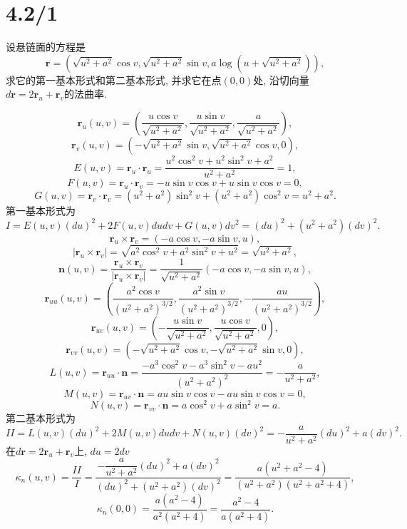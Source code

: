 \documentclass[11pt,a4paper]{article}
\author{刘逸灏 (515370910207)}
\begin{document}
\maketitle

\section{4.2/1}

\begin{problem}
设悬链面的方程是
$$\mathbf{r}=\left(\sqrt{u^2+a^2}\cos v,\sqrt{u^2+a^2}\sin v,a\log(u+\sqrt{u^2+a^2})\right),$$
求它的第一基本形式和第二基本形式, 并求它在点$(0,0)$处, 沿切向量$d\mathbf{r}=2\mathbf{r}_u+\mathbf{r}_v$的法曲率.
\end{problem}

$$\mathbf{r}_u(u,v)=\left(\frac{u \cos v}{\sqrt{u^2+a^2}},\frac{u \sin v}{\sqrt{u^2+a^2}},\frac{a}{\sqrt{u^2+a^2}}\right),$$
$$\mathbf{r}_v(u,v)=\left(-\sqrt{u^2+a^2}\sin v,\sqrt{u^2+a^2}\cos v,0\right),$$
$$E(u,v)=\mathbf{r}_u\cdot \mathbf{r}_u=\frac{u^2\cos^2v+u^2\sin^2v+a^2}{u^2+a^2}=1,$$
$$F(u,v)=\mathbf{r}_u\cdot \mathbf{r}_v=-u\sin v\cos v+u\sin v\cos v=0,$$
$$G(u,v)=\mathbf{r}_v\cdot \mathbf{r}_v=(u^2+a^2)\sin^2v+(u^2+a^2)\cos^2v=u^2+a^2.$$
第一基本形式为
$$I=E(u,v)(du)^2+2F(u,v)dudv+G(u,v)dv^2=(du)^2+(u^2+a^2)(dv)^2.$$
$$\mathbf{r}_u\times\mathbf{r}_v=(-a\cos v,-a\sin v,u),$$
$$|\mathbf{r}_u\times\mathbf{r}_v|=\sqrt{a^2\cos^2 v+a^2\sin^2 v+u^2}=\sqrt{u^2+a^2},$$
$$\mathbf{n}(u,v)=\frac{\mathbf{r}_u\times\mathbf{r}_v}{|\mathbf{r}_u\times\mathbf{r}_v|}=\frac{1}{\sqrt{u^2+a^2}}(-a\cos v,-a\sin v,u),$$
$$\mathbf{r}_{uu}(u,v)=\left(\frac{a^2 \cos v}{\left(u^2+a^2\right)^{3/2}},\frac{a^2 \sin v}{\left(u^2+a^2\right)^{3/2}},-\frac{a u}{\left(u^2+a^2\right)^{3/2}}\right),$$
$$\mathbf{r}_{uv}(u,v)=\left(-\frac{u\sin v}{\sqrt{u^2+a^2}},\frac{u\cos v}{\sqrt{u^2+a^2}},0\right),$$
$$\mathbf{r}_{vv}(u,v)=\left(-\sqrt{u^2+a^2}\cos v,-\sqrt{u^2+a^2}\sin v,0\right),$$
$$L(u,v)=\mathbf{r}_{uu}\cdot\mathbf{n}=\frac{-a^3\cos^2v-a^3\sin^2v-au^2}{(u^2+a^2)^2}=-\frac{a}{u^2+a^2},$$
$$M(u,v)=\mathbf{r}_{uv}\cdot\mathbf{n}=au\sin v\cos v-au\sin v\cos v=0,$$
$$N(u,v)=\mathbf{r}_{vv}\cdot\mathbf{n}=a\cos^2v+a\sin^2v=a.$$
第二基本形式为
$$II=L(u,v)(du)^2+2M(u,v)dudv+N(u,v)(dv)^2=-\frac{a}{u^2+a^2}(du)^2+a(dv)^2.$$
在$d\mathbf{r}=2\mathbf{r}_u+\mathbf{r}_v$上, $du=2dv$
$$\kappa_n(u,v)=\frac{II}{I}=\frac{-\dfrac{a}{u^2+a^2}(du)^2+a(dv)^2}{(du)^2+(u^2+a^2)(dv)^2}=\frac{a(u^2+a^2-4)}{(u^2+a^2)(u^2+a^2+4)},$$
$$\kappa_n(0,0)=\frac{a(a^2-4)}{a^2(a^2+4)}=\frac{a^2-4}{a(a^2+4)}.$$
\end{document}
